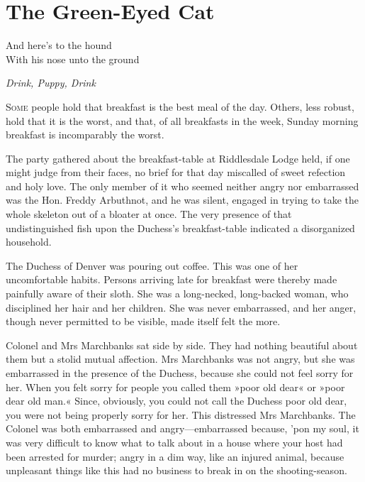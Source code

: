 

\chapter{The Green-Eyed Cat}

\epigraph{And here's to the hound\\With his nose unto the ground}{\textit{Drink, Puppy, Drink}}

\lettrine[lines=4]{S}{ome} people hold that breakfast is the best meal of the day. Others, less robust, hold that it is the worst, and that, of all breakfasts in the week, Sunday morning breakfast is incomparably the worst.

\zz
The party gathered about the breakfast-table at Riddlesdale Lodge held, if one might judge from their faces, no brief for that day miscalled of sweet refection and holy love. The only member of it who seemed neither angry nor embarrassed was the Hon. Freddy Arbuthnot, and he was silent, engaged in trying to take the whole skeleton out of a bloater at once.  The very presence of that undistinguished fish upon the Duchess's breakfast-table indicated a disorganized household.

The Duchess of Denver was pouring out coffee. This was one of her uncomfortable habits. Persons arriving late for breakfast were thereby made painfully aware of their sloth. She was a long-necked, long-backed woman, who disciplined her hair and her children. She was never embarrassed, and her anger, though never permitted to be visible, made itself felt the more.

Colonel and Mrs Marchbanks sat side by side. They had nothing beautiful about them but a stolid mutual affection. Mrs Marchbanks was not angry, but she was embarrassed in the presence of the Duchess, because she could not feel sorry for her. When you felt sorry for people you called them »poor old dear« or »poor dear old man.« Since, obviously, you could not call the Duchess poor old dear, you were not being properly sorry for her. This distressed Mrs Marchbanks. The Colonel was both embarrassed and angry—embarrassed because, 'pon my soul, it was very difficult to know what to talk about in a house where your host had been arrested for murder; angry in a dim way, like an injured animal, because unpleasant things like this had no business to break in on the shooting-season.


